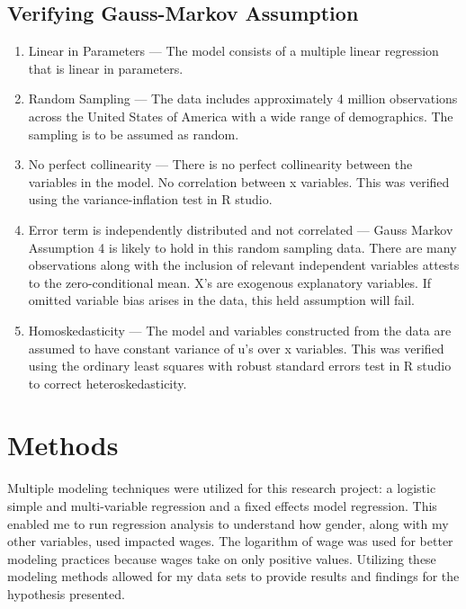 \documentclass[12pt, English]{article}
\begin{document}
\subsection*{Verifying Gauss-Markov Assumption}

\begin{enumerate}
    \item  Linear in Parameters — The model consists of a multiple linear regression that is linear in parameters.
    
    \item Random Sampling — The data includes approximately 4 million observations across the United States of America with a wide range of demographics. The sampling is to be assumed as random. 
    
    \item No perfect collinearity — There is no perfect collinearity between the variables in the model. No correlation between x variables. This was verified using the variance-inflation test in R studio. 
    
    \item Error term is independently distributed and not correlated — Gauss Markov Assumption 4 is likely to hold in this random sampling data. There are many observations along with the inclusion of relevant independent variables attests to the zero-conditional mean. X’s are exogenous explanatory variables. If omitted variable bias arises in the data, this held assumption will fail.
    
    \item Homoskedasticity — The model and variables constructed from the
    data are assumed to have constant variance of u’s over x variables. This was verified using the ordinary least squares with robust standard errors test in R studio to correct heteroskedasticity. 
\end{enumerate}

\newpage
\section{Methods}
Multiple modeling techniques were utilized for this research project: a logistic simple and multi-variable regression and a fixed effects model regression. This enabled me to run regression analysis to understand how gender, along with my other variables, used impacted wages. The logarithm of wage was used for better modeling practices because wages take on only positive values. Utilizing these modeling methods allowed for my data sets to provide results and findings for the hypothesis presented.  
\end{document}
